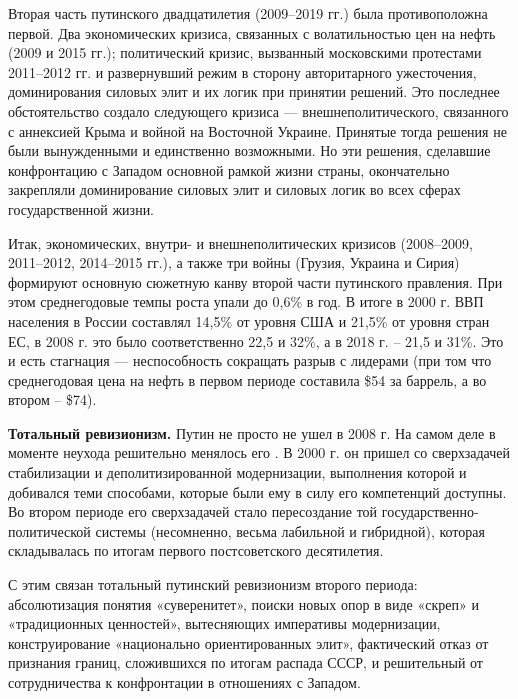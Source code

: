Вторая часть путинского двадцатилетия (2009–2019 гг.) была  противоположна первой. Два экономических кризиса, связанных с волатильностью цен на нефть (2009 и 2015 гг.); политический кризис, вызванный московскими протестами 2011–2012 гг. и развернувший режим в сторону авторитарного ужесточения, доминирования силовых элит и их логик при принятии решений.
Это последнее обстоятельство создало  следующего кризиса --- внешнеполитического, связанного с аннексией Крыма и войной на Восточной Украине. Принятые тогда решения не были вынужденными и единственно возможными. Но эти решения, сделавшие конфронтацию с Западом основной рамкой жизни страны, окончательно закрепляли доминирование силовых элит и силовых логик во всех сферах государственной жизни.

Итак,  экономических, внутри- и внешнеполитических кризисов (2008–2009, 2011–2012, 2014–2015 гг.), а также три войны (Грузия, Украина и Сирия) формируют основную сюжетную канву второй части путинского правления.
При этом среднегодовые темпы роста упали до 0,6\% в год. В итоге в 2000 г. ВВП  населения в России составлял 14,5\% от уровня США и 21,5\% от уровня стран ЕС, в 2008 г. это было соответственно 22,5 и 32\%, а в 2018 г. – 21,5 и 31\%. Это и есть стагнация --- неспособность сокращать разрыв с лидерами (при том что среднегодовая цена на нефть в первом периоде составила \$54 за баррель, а во втором – \$74).

\textbf{Тотальный ревизионизм.}
Путин не просто не ушел в 2008 г. На самом деле в моменте неухода решительно менялось его . В 2000 г. он пришел со сверхзадачей стабилизации и деполитизированной модернизации, выполнения которой и добивался теми способами, которые были ему в силу его компетенций доступны. Во втором периоде его сверхзадачей стало пересоздание той государственно-политической системы (несомненно, весьма лабильной и гибридной), которая складывалась по итогам первого постсоветского десятилетия.

С этим связан тотальный путинский ревизионизм второго периода: абсолютизация понятия «суверенитет», поиски новых опор в виде «скреп» и «традиционных ценностей», вытесняющих императивы модернизации, конструирование «национально ориентированных элит», фактический отказ от признания границ, сложившихся по итогам распада СССР, и решительный  от сотрудничества к конфронтации в отношениях с Западом.


